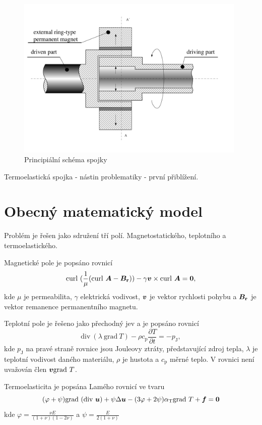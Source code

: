 \documentclass[a4paper, oneside, 11pt]{article}
\renewcommand{\vec}[1]{\mbox{\boldmath$#1$}} %
\newcommand{\grad}{\mathrm{grad}\ }
\newcommand{\curl}{\mathrm{curl}\ }
\renewcommand{\div}{\mathrm{div}\ }
\begin{document}
\renewcommand\thepage{\arabic{page}}
\setcounter{page}{1}


 \\



\begin{figure}[!hbt]
\centering
\includegraphics[width=11cm]{spojka.pdf}
\caption{Principiální schéma spojky}
\label{fig:schema_spojky}
\end{figure}

Termoelastická spojka - nástin problematiky - první přiblížení.

\section{Obecný matematický model}
Problém je řešen jako sdružení tří polí. Magnetostatického, teplotního a termoelastického.

Magnetické pole je popsáno rovnicí
$$
\curl (\frac{1}{\mu} (\curl \vec{A} - \vec{B_\mathrm{r}})) - \gamma \vec{v} \times \curl \vec{A} = \vec{0},
$$
kde $\mu$ je permeabilita, $\gamma$ elektrická vodivost, $\vec{v}$ je vektor rychlosti pohybu a $\vec{B_\mathrm{r}}$ je vektor remanence permanentního magnetu.

Teplotní pole je řešeno jako přechodný jev a je popsáno rovnicí
$$
\div (\lambda~\grad T) - \rho c_\mathrm{p} \frac{\partial T}{\partial t} = -p_\mathrm{J},
$$
kde $p_\mathrm{J}$ na pravé straně rovnice jsou Jouleovy ztráty, představující zdroj tepla, $\lambda$ je teplotní vodivost daného materiálu, $\rho$ je hustota a $c_\mathrm{p}$ měrné teplo. V rovnici není uvažován člen $\vec{v} \grad T$.

Termoelasticita je popsána Lamého rovnicí ve tvaru
$$
(\varphi + \psi) \grad(\div \vec{u}) + \psi \Delta \vec{u} - (3\varphi+2\psi) \alpha_{\mathrm{T}} \grad T + \vec{f} = \vec{0} 
$$
kde 
$\varphi=\frac{\nu E}{(1+\nu)(1-2\nu)}$ a $\psi=\frac{E}{2(1+\nu)}$ 
\end{document}
